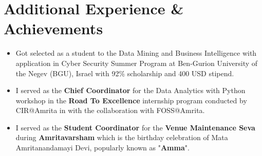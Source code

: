 \documentclass[letterpaper,11pt]{article}
\newcommand{\resumeSubHeadingListStart}{\begin{itemize}[leftmargin=*]}
\newcommand{\resumeSubHeadingListEnd}{\end{itemize}}
\newcommand{\shorterSection}[1]{\vspace{-10pt}\section{#1}}
\begin{document}
\shorterSection{Additional Experience \& Achievements}
  \resumeSubHeadingListStart
  \small
    \item{Got selected as a student to the Data Mining and Business Intelligence with application in Cyber Security Summer Program at Ben-Gurion University of the Negev (BGU), Israel with 92\% scholarship and 400 USD stipend.}
    \vspace{-5pt}
    \item{I served as the \textbf{Chief Coordinator} for the Data Analytics with Python workshop in the \textbf{Road To Excellence} internship program conducted by CIR@Amrita in with the collaboration with FOSS@Amrita.}
    \vspace{-5pt}    
	\item{I served as the \textbf{Student Coordinator} for the \textbf{Venue Maintenance Seva} during \textbf{Amritavarsham} which is the birthday celebration of Mata Amritanandamayi Devi, popularly known as "\textbf{Amma}".}
  \resumeSubHeadingListEnd
\end{document}
